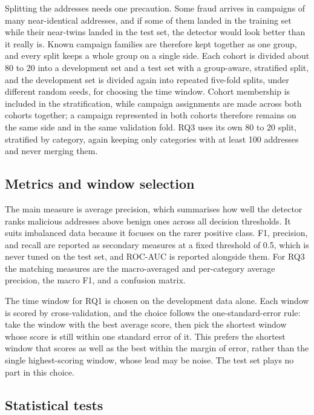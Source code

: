 \documentclass{thesisclass}
\begin{document}
Splitting the addresses needs one precaution. Some fraud arrives in campaigns of
many near-identical addresses, and if some of them landed in the training set
while their near-twins landed in the test set, the detector would look better than
it really is. Known campaign families are therefore kept together as one group,
and every split keeps a whole group on a single side. Each cohort is divided about
80 to 20 into a development set and a test set with a group-aware, stratified
split, and the development set is divided again into repeated five-fold splits,
under different random seeds, for choosing the time window. Cohort membership is
included in the stratification, while campaign assignments are made across both
cohorts together; a campaign represented in both cohorts therefore remains on
the same side and in the same validation fold. RQ3 uses its own 80 to
20 split, stratified by category, again keeping only categories with at least 100
addresses and never merging them.

\subsection{Metrics and window selection}

The main measure is average precision, which summarises how well the detector
ranks malicious addresses above benign ones across all decision thresholds. It
suits imbalanced data because it focuses on the rarer positive class. F1,
precision, and recall are reported as secondary measures at a fixed threshold of
0.5, which is never tuned on the test set, and ROC-AUC is reported alongside them.
For RQ3 the matching measures are the macro-averaged and per-category average
precision, the macro F1, and a confusion matrix.

The time window for RQ1 is chosen on the development data alone. Each window is
scored by cross-validation, and the choice follows the one-standard-error rule:
take the window with the best average score, then pick the shortest window whose
score is still within one standard error of it. This prefers the shortest window
that scores as well as the best within the margin of error, rather than the single
highest-scoring window, whose lead may be noise. The test set plays no part in this
choice.

\subsection{Statistical tests}
\end{document}
